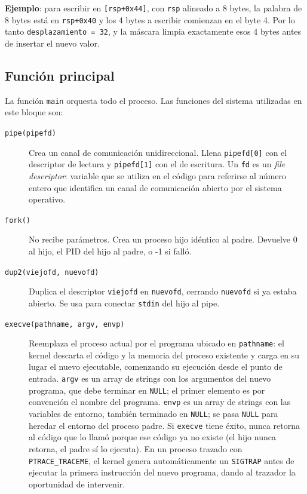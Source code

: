 \documentclass[10pt,a4paper]{article}
\begin{document}
\textbf{Ejemplo}: para escribir en \texttt{[rsp+0x44]}, con \texttt{rsp} alineado a 8 bytes, la palabra de 8 bytes está en \texttt{rsp+0x40} y los 4 bytes a escribir comienzan en el byte 4. Por lo tanto \texttt{desplazamiento = 32}, y la máscara limpia exactamente esos 4 bytes antes de insertar el nuevo valor.

\subsection{Función principal}

La función \texttt{main} orquesta todo el proceso. Las funciones del sistema utilizadas en este bloque son:

\begin{description}
    \item[\texttt{pipe(pipefd)}] Crea un canal de comunicación unidireccional. Llena \texttt{pipefd[0]} con el descriptor de lectura y \texttt{pipefd[1]} con el de escritura. Un \texttt{fd} es un \textit{file descriptor}: variable que se utiliza en el código para referirse al número entero que identifica un canal de comunicación abierto por el sistema operativo.
    \item[\texttt{fork()}] No recibe parámetros. Crea un proceso hijo idéntico al padre. Devuelve 0 al hijo, el PID del hijo al padre, o -1 si falló.
    \item[\texttt{dup2(viejofd, nuevofd)}] Duplica el descriptor \texttt{viejofd} en \texttt{nuevofd}, cerrando \texttt{nuevofd} si ya estaba abierto. Se usa para conectar \texttt{stdin} del hijo al pipe.
    \item[\texttt{execve(pathname, argv, envp)}] Reemplaza el proceso actual por el programa ubicado en \texttt{pathname}: el kernel descarta el código y la memoria del proceso existente y carga en su lugar el nuevo ejecutable, comenzando su ejecución desde el punto de entrada. \texttt{argv} es un array de strings con los argumentos del nuevo programa, que debe terminar en \texttt{NULL}; el primer elemento es por convención el nombre del programa. \texttt{envp} es un array de strings con las variables de entorno, también terminado en \texttt{NULL}; se pasa \texttt{NULL} para heredar el entorno del proceso padre. Si \texttt{execve} tiene éxito, nunca retorna al código que lo llamó porque ese código ya no existe (el hijo nunca retorna, el padre sí lo ejecuta). En un proceso trazado con \texttt{PTRACE\_TRACEME}, el kernel genera automáticamente un \texttt{SIGTRAP} antes de ejecutar la primera instrucción del nuevo programa, dando al trazador la oportunidad de intervenir.

\end{description}
\end{document}
